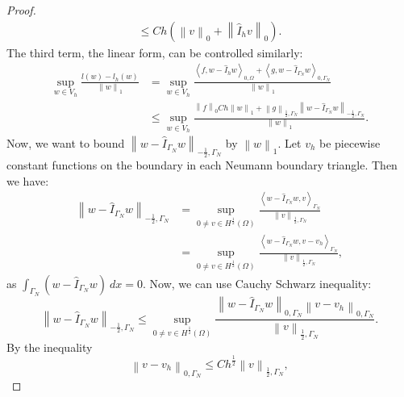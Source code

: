 \documentclass[../Main/main.tex]{subfiles}
\begin{document}
\begin{proof}
\begin{equation}
\begin{gathered}
				\leq Ch \left (\left \| v \right \|_0 + \left \| \hat{I}_h v \right \|_0 \right ).
			\end{gathered}
		\end{equation}
		The third term, the linear form, can be controlled similarly:
		\begin{equation}\label{eq:334}
			\begin{aligned}
				\sup_{w \in V_h} \frac{l(w)-l_h(w)}{\left \| w \right \|_1} &= \sup_{w \in V_h} \frac{\left \langle f,w-\hat{I}_h w \right \rangle_{0,\Omega} + \left \langle g,w-\hat{I}_{\Gamma_N} w \right \rangle_{0,\Gamma_N}}{\left \| w \right \|_1}\\
				&\leq \sup_{w \in V_h} \frac{\left \|f\right \|_0 Ch\left \|w \right \|_1 + \left \|g\right \|_{\frac{1}{2},\Gamma_N}\left \|w-\hat{I}_{\Gamma_N} w\right \|_{-\frac{1}{2},\Gamma_N}}{\left \| w \right \|_1}.
			\end{aligned}
		\end{equation}
		Now, we want to bound $\left \|w-\hat{I}_{\Gamma_N} w\right \|_{-\frac{1}{2},\Gamma_N}$ by $\left \| w \right \|_1$. Let $v_h$ be piecewise constant functions on the boundary in each Neumann boundary triangle. Then we have:
		\begin{equation}
			\begin{aligned}
				\left \|w-\hat{I}_{\Gamma_N} w\right \|_{-\frac{1}{2},\Gamma_N} &= \sup_{0 \neq v \in H^{\frac{1}{2}}(\Omega)}\frac{\left \langle w-\hat{I}_{\Gamma_N} w,v\right \rangle_{\Gamma_N}}{\left \| v \right \|_{\frac{1}{2},\Gamma_N}}\\
				&=\sup_{0 \neq v \in H^{\frac{1}{2}}(\Omega)}\frac{\left \langle w-\hat{I}_{\Gamma_N} w,v-v_h\right \rangle_{\Gamma_N}}{\left \| v\right \|_{\frac{1}{2},\Gamma_N}},
			\end{aligned}
		\end{equation}
		as $\int_{\Gamma_N} (w-\hat{I}_{\Gamma_N} w) \ dx = 0$. Now, we can use Cauchy Schwarz inequality:
		\begin{equation}\label{eq:neumann CS estimate}
			\left \|w-\hat{I}_{\Gamma_N} w\right \|_{-\frac{1}{2},\Gamma_N} \leq \sup_{0 \neq v \in H^{\frac{1}{2}}(\Omega)}\frac{\left \| w-\hat{I}_{\Gamma_N} w\right \|_{0,\Gamma_N}\left \| v-v_h\right \|_{0,\Gamma_N}}{\left \| v\right \|_{\frac{1}{2},\Gamma_N}}.
		\end{equation}
		By the inequality
		\begin{equation}\label{eq:difficult inequality}
			\left \| v-v_h\right \|_{0,\Gamma_N} \leq C h^{\frac{1}{2}} \left \| v \right \|_{\frac{1}{2}, \Gamma_N},

\end{equation}
\end{proof}
\end{document}
